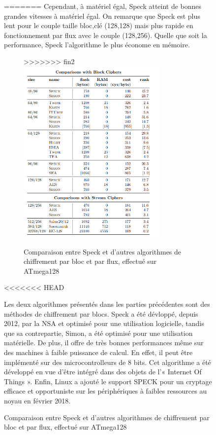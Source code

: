 			\begin{figure}[!h]
=======
			Cependant, à matériel égal, Speck atteint de bonnes grandes vitesses à matériel
			égal. On remarque que Speck est plus lent pour le couple taille bloc,clé
			(128,128) mais plus rapide en fonctionnement par flux avec le couple (128,256).
			Quelle que soit la performance, Speck l'algorithme le plus économe en mémoire.


			\begin{figure}[H]
>>>>>>> fin2
				\centering
				\includegraphics[width=0.8\textwidth]{imgs/perfSpeck.png}
				\caption{Comparaison entre Speck et d'autres algorithmes de chiffrement par bloc et par flux, effectué sur ATmega128 \cite{speck_micro}}
				\label{perfSpeck}
			\end{figure}
<<<<<<< HEAD
			
			Les deux algorithmes présentés dans les parties précédentes sont des méthodes de chiffrement par blocs.
			Speck a été dévloppé, depuis 2012, par la NSA et optimisé pour une utilisation logicielle, tandis que sa contrepartie, Simon, a été optimisé pour une utilisation matérielle.
			De plus, il offre de très bonnes performances même sur des machines à faible puissance de calcul.
			En effet, il peut être implémenté sur des microcontrolleurs de 8 bits.
			Cet algorithme a été développé en vue d'être intégré dans des objets de l'« Internet Of Things ».
			Enfin, Linux a ajouté le support SPECK pour un cryptage efficace et opportuniste sur les périphériques à faibles ressources au noyau en février 2018.
			

\end{figure}
